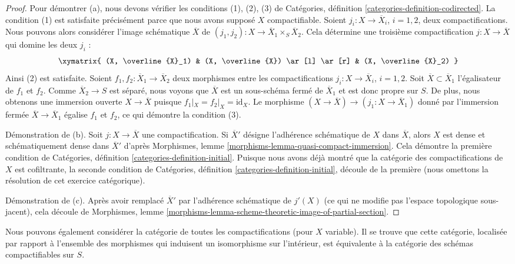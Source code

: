 \begin{proof}
Pour démontrer (a), nous devons vérifier les conditions (1), (2), (3) de
Catégories, définition \ref{categories-definition-codirected}.
La condition (1) est satisfaite précisément parce que nous avons supposé $X$
compactifiable.
Soient $j_i : X \to \overline{X}_i$, $i = 1, 2$, deux compactifications.
Nous pouvons alors considérer l'image schématique $\overline{X}$
de $(j_1, j_2) : X \to \overline{X}_1 \times_S \overline{X}_2$.
Cela détermine une troisième compactification $j : X \to \overline{X}$
qui domine les deux $j_i$ :
$$
\xymatrix{
(X, \overline{X}_1) & (X, \overline{X}) \ar[l] \ar[r] & (X, \overline{X}_2)
}
$$
Ainsi (2) est satisfaite. Soient $f_1, f_2 : \overline{X}_1 \to \overline{X}_2$
deux morphismes entre les compactifications
$j_i : X \to \overline{X}_i$, $i = 1, 2$.
Soit $\overline{X} \subset \overline{X}_1$ l'égalisateur de
$f_1$ et $f_2$. Comme $\overline{X}_2 \to S$ est séparé, nous voyons
que $\overline{X}$ est un sous-schéma fermé de $\overline{X}_1$
et est donc propre sur $S$. De plus, nous obtenons une
immersion ouverte $X \to \overline{X}$ puisque $f_1|_X = f_2|_X = \text{id}_X$.
Le morphisme $(X \to \overline{X}) \to (j_1 : X \to \overline{X}_1)$
donné par l'immersion fermée $\overline{X} \to \overline{X}_1$
égalise $f_1$ et $f_2$, ce qui démontre la condition (3).

\medskip\noindent
Démonstration de (b). Soit $j : X \to \overline{X}$ une compactification.
Si $\overline{X}'$ désigne l'adhérence schématique de $X$
dans $\overline{X}$, alors $X$ est dense et schématiquement dense
dans $\overline{X}'$ d'après
Morphismes, lemme \ref{morphisms-lemma-quasi-compact-immersion}.
Cela démontre la première condition de
Catégories, définition \ref{categories-definition-initial}.
Puisque nous avons déjà montré que la catégorie des compactifications
de $X$ est cofiltrante, la seconde condition de
Catégories, définition \ref{categories-definition-initial},
découle de la première (nous omettons la résolution de cet
exercice catégorique).

\medskip\noindent
Démonstration de (c). Après avoir remplacé $\overline{X}'$ par l'adhérence schématique
de $j'(X)$ (ce qui ne modifie pas l'espace topologique sous-jacent),
cela découle de Morphismes, lemme
\ref{morphisms-lemma-scheme-theoretic-image-of-partial-section}.
\end{proof}

\noindent
Nous pouvons également considérer la catégorie de toutes les compactifications (pour $X$ variable).
Il se trouve que cette catégorie, localisée par rapport à l'ensemble des morphismes
qui induisent un isomorphisme sur l'intérieur,
est équivalente à la catégorie des schémas compactifiables sur $S$.

